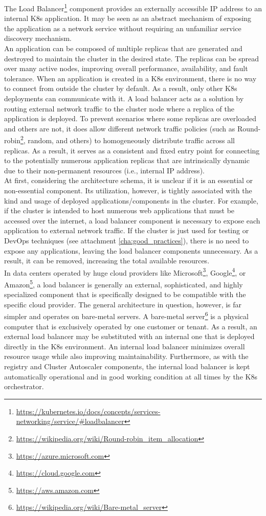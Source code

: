 The Load Balancer\footnote{\url{https://kubernetes.io/docs/concepts/services-networking/service/\#loadbalancer}}
component provides an externally accessible IP address to an internal K8s application.
It may be seen as an abstract mechanism of exposing the application as a network
service without requiring an unfamiliar service discovery mechanism. \\ %
An application can be composed of multiple replicas that are generated and
destroyed to maintain the cluster in the desired state. The replicas can be spread
over many active nodes, improving overall performance, availability, and fault
tolerance. When an application is created in a K8s environment, there is no way
to connect from outside the cluster by default. As a result, only other K8s
deployments can communicate with it. A load balancer acts as a solution by routing
external network traffic to the cluster node where a replica of the application is
deployed. To prevent scenarios where some replicas are overloaded and others are
not, it does allow different network traffic policies (such as Round-robin\footnote{\url{https://wikipedia.org/wiki/Round-robin_item_allocation}},
random, and others) to homogeneously distribute traffic across all replicas. As
a result, it serves as a consistent and fixed entry point for connecting to the potentially
numerous application replicas that are intrinsically dynamic due to their non-permanent
resources (i.e., internal IP address). \\ %
At first, considering the architecture schema, it is unclear if it is an essential
or non-essential component. Its utilization, however, is tightly associated with
the kind and usage of deployed applications/components in the cluster. For example,
if the cluster is intended to host numerous web applications that must be
accessed over the internet, a load balancer component is necessary to expose each
application to external network traffic. If the cluster is just used for testing
or DevOps techniques (see attachment \ref{cha:good_practices}), there is no need
to expose any applications, leaving the load balancer components unnecessary. As
a result, it can be removed, increasing the total available resources. \\ %
In data centers operated by huge cloud providers like Microsoft\footnote{\url{https://azure.microsoft.com}},
Google\footnote{\url{https://cloud.google.com}}, or Amazon\footnote{\url{https://aws.amazon.com}},
a load balancer is generally an external, sophisticated, and highly specialized
component that is specifically designed to be compatible with the specific cloud
provider. The general architecture in question, however, is far simpler and operates
on bare-metal servers. A bare-metal server\footnote{\url{https://wikipedia.org/wiki/Bare-metal_server}}
is a physical computer that is exclusively operated by one customer or tenant. As
a result, an external load balancer may be substituted with an internal one that
is deployed directly in the K8s environment. An internal load balancer minimizes
overall resource usage while also improving maintainability. Furthermore, as with
the registry and Cluster Autoscaler components, the internal load balancer is
kept automatically operational and in good working condition at all times by the
K8s orchestrator.

